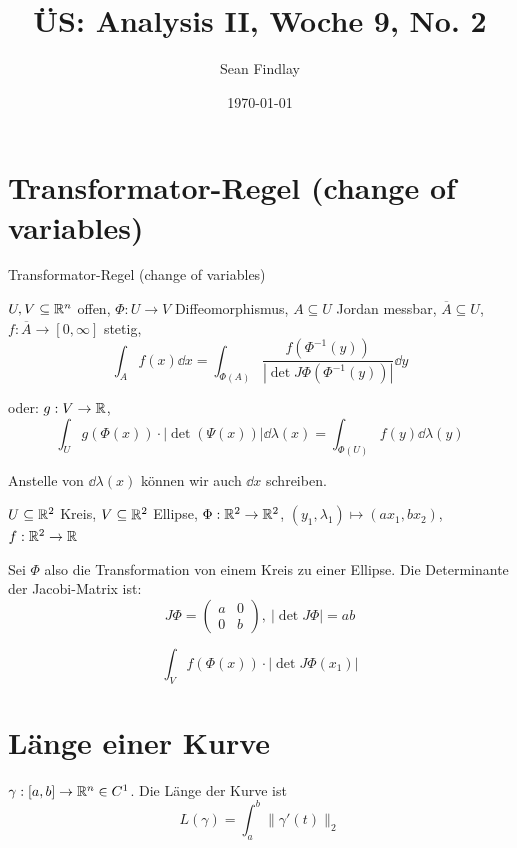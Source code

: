 \documentclass[12pt]{article}
\title{ÜS: Analysis II, Woche 9, No. 2}
\author{Sean Findlay}
\date{\today}
\begin{document}
\maketitle

\section{Transformator-Regel (change of variables)}

\begin{definition}{Transformator-Regel (change of variables)}{}
    
    $U, V \subseteq \mathbb{R}^n$ offen, $\Phi: U \rightarrow V$ Diffeomorphismus, $A \subseteq U$ Jordan messbar, $\overline{A} \subseteq U$, $f: \overline{A} \rightarrow [0, \infty]$ stetig, 
    $$
        \int_A f(x) \dd x = \int_{\Phi(A)} \frac{f(\Phi^{-1}(y))}{\left| \det J \Phi(\Phi^{-1}(y)) \right|} \dd y
    $$

    oder: 
    $g: V \rightarrow \mathbb{R}$,
    $$
        \int_U g(\Phi(x)) \cdot |\det(\Psi(x))| \dd \lambda(x) = \int_{\Phi(U)} f(y) \dd \lambda(y)
    $$

    Anstelle von $\dd \lambda(x)$ können wir auch $\dd x$ schreiben.
\end{definition}

\begin{example}{}{}
    $U \subseteq \mathbb{R}^2$ Kreis, $V \subseteq \mathbb{R}^2$ Ellipse, $\Phi: \mathbb{R}^2 \rightarrow \mathbb{R}^2$, $(y_1, \lambda_1) \mapsto (ax_1, bx_2)$, $f: \mathbb{R}^2 \rightarrow \mathbb{R}$

    Sei $\Phi$ also die Transformation von einem Kreis zu einer Ellipse. Die Determinante der Jacobi-Matrix ist:
    $$
        J\Phi = \begin{pmatrix}
            a & 0 \\
            0 & b
        \end{pmatrix},\ |\det J \Phi| = ab
    $$

    $$
        \int_V f(\Phi(x)) \cdot |\det J \Phi(x_1)| 
    $$
\end{example}

\section{Länge einer Kurve}

\begin{definition}{}{}
    $\gamma: [a, b] \rightarrow \mathbb{R}^n \in C^1$. Die Länge der Kurve ist
    $$
        L(\gamma) = \int_{a}^{b} \lVert \gamma'(t) \rVert_2
    $$
\end{definition}
\end{document}
